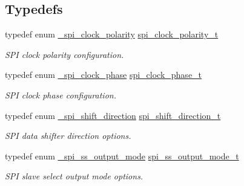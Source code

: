 \subsection*{Typedefs}
\begin{DoxyCompactItemize}
\item 
\mbox{\label{group__spi__driver_ga9de95ac02ae859ac26534c06eb47b5b8}} 
typedef enum \mbox{\hyperlink{group__spi__driver_ga17f9450af8f63de3fa2b3b105eeec38d}{\+\_\+spi\+\_\+clock\+\_\+polarity}} \mbox{\hyperlink{group__spi__driver_ga9de95ac02ae859ac26534c06eb47b5b8}{spi\+\_\+clock\+\_\+polarity\+\_\+t}}
\begin{DoxyCompactList}\small\item\em S\+PI clock polarity configuration. \end{DoxyCompactList}\item 
\mbox{\label{group__spi__driver_ga12e1c73dd72aaabd76ff5ce23c0d3244}} 
typedef enum \mbox{\hyperlink{group__spi__driver_ga76b6ec98408fdaf2e9133952eefa1baa}{\+\_\+spi\+\_\+clock\+\_\+phase}} \mbox{\hyperlink{group__spi__driver_ga12e1c73dd72aaabd76ff5ce23c0d3244}{spi\+\_\+clock\+\_\+phase\+\_\+t}}
\begin{DoxyCompactList}\small\item\em S\+PI clock phase configuration. \end{DoxyCompactList}\item 
\mbox{\label{group__spi__driver_gadc24bb931a59fc64ee4cb60ed56addb4}} 
typedef enum \mbox{\hyperlink{group__spi__driver_ga1737fd82344e0800f66b541342894b85}{\+\_\+spi\+\_\+shift\+\_\+direction}} \mbox{\hyperlink{group__spi__driver_gadc24bb931a59fc64ee4cb60ed56addb4}{spi\+\_\+shift\+\_\+direction\+\_\+t}}
\begin{DoxyCompactList}\small\item\em S\+PI data shifter direction options. \end{DoxyCompactList}\item 
\mbox{\label{group__spi__driver_gaba865b4b3ce19476407c3013454c8217}} 
typedef enum \mbox{\hyperlink{group__spi__driver_ga2e815689312c22a94fe0519f7bc0a991}{\+\_\+spi\+\_\+ss\+\_\+output\+\_\+mode}} \mbox{\hyperlink{group__spi__driver_gaba865b4b3ce19476407c3013454c8217}{spi\+\_\+ss\+\_\+output\+\_\+mode\+\_\+t}}
\begin{DoxyCompactList}\small\item\em S\+PI slave select output mode options. \end{DoxyCompactList}\item 

\end{DoxyCompactItemize}
